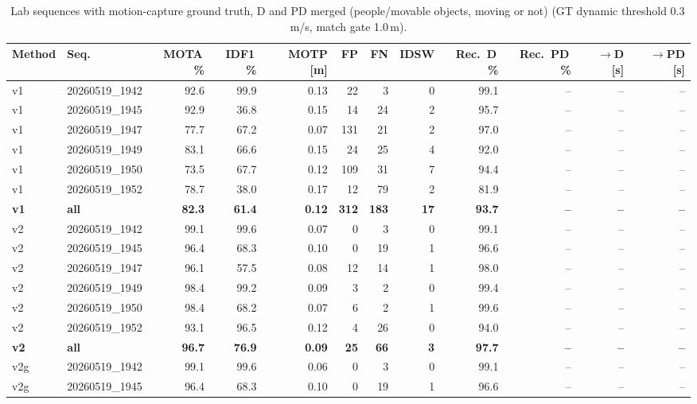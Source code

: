 \begin{table}[t]
\centering
\caption{Lab sequences with motion-capture ground truth, D and PD merged (people/movable objects, moving or not) (GT dynamic threshold 0.3\,m/s, match gate 1.0\,m).}
\label{tab:own_r8c_merged}
\setlength{\tabcolsep}{3pt}
\begin{tabular}{llrrrrrrrrrr}
\toprule
Method & Seq. & MOTA\,\% & IDF1\,\% & MOTP [m] & FP & FN & IDSW & Rec.\ D\,\% & Rec.\ PD\,\% & $\to$D [s] & $\to$PD [s] \\
\midrule
v1 & 20260519\_1942 & 92.6 & 99.9 & 0.13 & 22 & 3 & 0 & 99.1 & -- & -- & -- \\
v1 & 20260519\_1945 & 92.9 & 36.8 & 0.15 & 14 & 24 & 2 & 95.7 & -- & -- & -- \\
v1 & 20260519\_1947 & 77.7 & 67.2 & 0.07 & 131 & 21 & 2 & 97.0 & -- & -- & -- \\
v1 & 20260519\_1949 & 83.1 & 66.6 & 0.15 & 24 & 25 & 4 & 92.0 & -- & -- & -- \\
v1 & 20260519\_1950 & 73.5 & 67.7 & 0.12 & 109 & 31 & 7 & 94.4 & -- & -- & -- \\
v1 & 20260519\_1952 & 78.7 & 38.0 & 0.17 & 12 & 79 & 2 & 81.9 & -- & -- & -- \\
\textbf{v1} & \textbf{all} & \textbf{82.3} & \textbf{61.4} & \textbf{0.12} & \textbf{312} & \textbf{183} & \textbf{17} & \textbf{93.7} & \textbf{--} & \textbf{--} & \textbf{--} \\
\midrule
v2 & 20260519\_1942 & 99.1 & 99.6 & 0.07 & 0 & 3 & 0 & 99.1 & -- & -- & -- \\
v2 & 20260519\_1945 & 96.4 & 68.3 & 0.10 & 0 & 19 & 1 & 96.6 & -- & -- & -- \\
v2 & 20260519\_1947 & 96.1 & 57.5 & 0.08 & 12 & 14 & 1 & 98.0 & -- & -- & -- \\
v2 & 20260519\_1949 & 98.4 & 99.2 & 0.09 & 3 & 2 & 0 & 99.4 & -- & -- & -- \\
v2 & 20260519\_1950 & 98.4 & 68.2 & 0.07 & 6 & 2 & 1 & 99.6 & -- & -- & -- \\
v2 & 20260519\_1952 & 93.1 & 96.5 & 0.12 & 4 & 26 & 0 & 94.0 & -- & -- & -- \\
\textbf{v2} & \textbf{all} & \textbf{96.7} & \textbf{76.9} & \textbf{0.09} & \textbf{25} & \textbf{66} & \textbf{3} & \textbf{97.7} & \textbf{--} & \textbf{--} & \textbf{--} \\
\midrule
v2g & 20260519\_1942 & 99.1 & 99.6 & 0.06 & 0 & 3 & 0 & 99.1 & -- & -- & -- \\
v2g & 20260519\_1945 & 96.4 & 68.3 & 0.10 & 0 & 19 & 1 & 96.6 & -- & -- & -- \\

\end{tabular}
\end{table}
